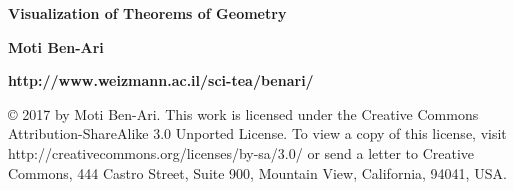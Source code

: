 \documentclass[a4paper]{article}
\begin{document}
\thispagestyle{empty}

\begin{center}
\textbf{\sffamily \Large Visualization of Theorems of Geometry}

\bigskip

\textbf{\sffamily \large Moti Ben-Ari}

\bigskip

\textbf{\sffamily \large http://www.weizmann.ac.il/sci-tea/benari/}

\end{center}

\textsf{\footnotesize \copyright{} 2017 by Moti Ben-Ari. This work is licensed under the Creative Commons Attribution-ShareAlike 3.0 Unported License. To view a copy of this license, visit http://creativecommons.org/licenses/by-sa/3.0/ or send a letter to Creative Commons, 444 Castro Street, Suite 900, Mountain View, California, 94041, USA.}

\bigskip


\end{document}

